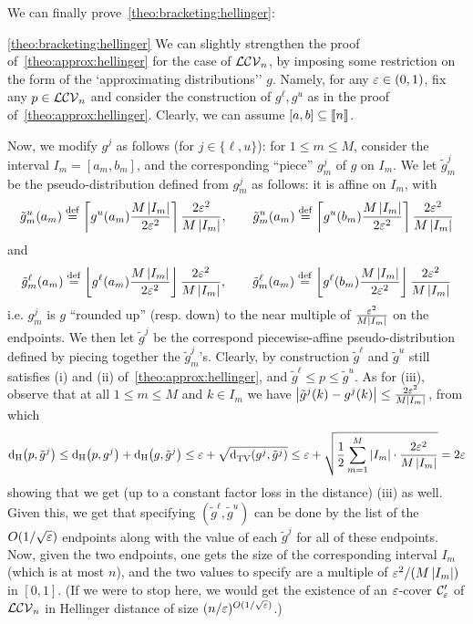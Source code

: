 \noindent We can finally prove~\cref{theo:bracketing:hellinger}:
\begin{proofof}{\cref{theo:bracketing:hellinger}}
We can slightly strengthen the proof of~\cref{theo:approx:hellinger} for the case of $\classlogconcave[n]$, by imposing some restriction on the form of the `approximating distributions'' $g$. Namely, for any $\eps\in(0,1)$, fix any $p\in\classlogconcave[n]$ and consider the construction of $g^\ell,g^u$ as in the proof of~\cref{theo:approx:hellinger}. Clearly, we can assume $[a,b]\subseteq\modulo{n}$. 

Now, we modify $g^j$ as follows (for $j\in\{\ell,u\}$): for $1\leq m\leq M$, consider the interval $I_m=[a_m,b_m]$, and the corresponding ``piece'' $g^j_m$ of $g$ on $I_m$. We let $\tilde{g}^j_m$ be the pseudo-distribution defined from $g^j_m$ as follows: it is affine on $I_m$, with
\[
\tilde{g}^u_m(a_m) \eqdef \clg{g^u(a_m)\frac{M\abs{I_m}}{2\eps^2}}\frac{2\eps^2}{M\abs{I_m}}, \qquad \tilde{g}^u_m(a_m) \eqdef \clg{g^u(b_m)\frac{M\abs{I_m}}{2\eps^2}}\frac{2\eps^2}{M\abs{I_m}}
\]
and
\[
\tilde{g}^\ell_m(a_m) \eqdef \flr{g^\ell(a_m)\frac{M\abs{I_m}}{2\eps^2}}\frac{2\eps^2}{M\abs{I_m}}, \qquad \tilde{g}^\ell_m(a_m) \eqdef \flr{g^\ell(b_m)\frac{M\abs{I_m}}{2\eps^2}}\frac{2\eps^2}{M\abs{I_m}}
\]
i.e. $g^j_m$ is $g$ ``rounded up'' (resp. down) to the near multiple of $\frac{\eps^2}{M\abs{I_m}}$ on the endpoints. We then let $\tilde{g}^j$ be the correspond piecewise-affine pseudo-distribution defined by piecing together the $\tilde{g}^j_m$'s. Clearly, by construction $\tilde{g}^\ell$ and $\tilde{g}^u$ still satisfies (i) and (ii) of~\cref{theo:approx:hellinger}, and $\tilde{g}^\ell\leq p\leq\tilde{g}^u$. As for (iii), observe that at all $1\leq m\leq M$ and $k\in I_m$ we have $\abs{\tilde{g}^j(k)-g^j(k)} \leq \frac{2\eps^2}{M\abs{I_m}}$, from which
\[
  \hellinger{p}{\tilde{g}^j} \leq \hellinger{p}{g^j} + \hellinger{g}{\tilde{g}^j}
  \leq \eps + \sqrt{\totalvardist{g^j}{\tilde{g}^j}}
  \leq \eps + \sqrt{\frac{1}{2}\sum_{m=1}^M \abs{I_m}\cdot\frac{2\eps^2}{M\abs{I_m}}}
  = 2\eps
\]
showing that we get (up to a constant factor loss in the distance) (iii) as well. Given this, we get that specifying $(\tilde{g}^\ell,\tilde{g}^u)$ can be done by the list of the $O(1/\sqrt{\eps})$ endpoints along with the value of each $\tilde{g}^j$ for all of these endpoints. Now, given the two endpoints, one gets the size of the corresponding interval $I_m$ (which is at most $n$), and the two values to specify are a multiple of $\eps^2/(M\abs{I_m})$ in $[0,1]$. (If we were to stop here, we would get the existence of an $\eps$-cover $\class'_\eps$ of $\classlogconcave[n]$ in Hellinger distance of size $(n/\eps)^{O(1/\sqrt{\eps})}$.)



\end{proofof}
